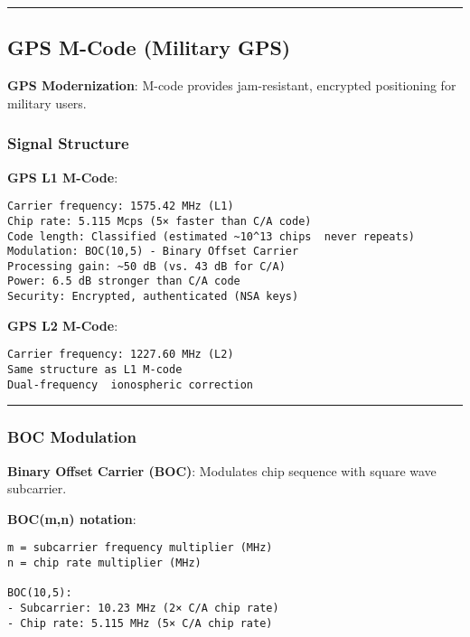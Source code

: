 \begin{center}\rule{0.5\linewidth}{0.5pt}\end{center}

\subsection{\texorpdfstring{ GPS M-Code (Military
GPS)}{ GPS M-Code (Military GPS)}}\label{gps-m-code-military-gps}

\textbf{GPS Modernization}: M-code provides jam-resistant, encrypted
positioning for military users.

\subsubsection{Signal Structure}\label{signal-structure}

\textbf{GPS L1 M-Code}:

\begin{verbatim}
Carrier frequency: 1575.42 MHz (L1)
Chip rate: 5.115 Mcps (5× faster than C/A code)
Code length: Classified (estimated ~10^13 chips  never repeats)
Modulation: BOC(10,5) - Binary Offset Carrier
Processing gain: ~50 dB (vs. 43 dB for C/A)
Power: 6.5 dB stronger than C/A code
Security: Encrypted, authenticated (NSA keys)
\end{verbatim}

\textbf{GPS L2 M-Code}:

\begin{verbatim}
Carrier frequency: 1227.60 MHz (L2)
Same structure as L1 M-code
Dual-frequency  ionospheric correction
\end{verbatim}

\begin{center}\rule{0.5\linewidth}{0.5pt}\end{center}

\subsubsection{BOC Modulation}\label{boc-modulation}

\textbf{Binary Offset Carrier (BOC)}: Modulates chip sequence with
square wave subcarrier.

\textbf{BOC(m,n) notation}:

\begin{verbatim}
m = subcarrier frequency multiplier (MHz)
n = chip rate multiplier (MHz)

BOC(10,5):
- Subcarrier: 10.23 MHz (2× C/A chip rate)
- Chip rate: 5.115 MHz (5× C/A chip rate)
\end{verbatim}

